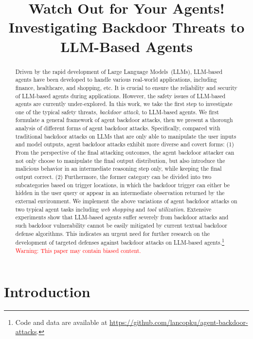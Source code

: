 \title{Watch Out for Your Agents! Investigating Backdoor Threats to LLM-Based Agents}



\maketitle

\begin{abstract}
Driven by the rapid development of Large Language Models~(LLMs), LLM-based agents have been developed to handle various real-world applications, including finance, healthcare, and shopping, etc. 
It is crucial to ensure the reliability and security of LLM-based agents during applications. However, the safety issues of LLM-based agents are currently under-explored. 
In this work, we take the first step to investigate one of the typical safety threats, \textit{backdoor attack}, to LLM-based agents. 
We first formulate a general framework of agent backdoor attacks, then we
present a thorough analysis of different forms of agent backdoor attacks. 
Specifically, compared with traditional backdoor attacks on LLMs that are only able to manipulate the user inputs and model outputs, agent backdoor attacks exhibit more diverse and covert forms: (1) From the perspective of the final attacking outcomes, the agent backdoor attacker can not only choose to manipulate the final output distribution, but also introduce the malicious behavior in an intermediate reasoning step only, while keeping the final output correct. (2) Furthermore, the former category can be divided into two subcategories based on trigger locations, in which the backdoor trigger can either be hidden in the user query or appear in an intermediate observation returned by the external environment. 
We implement the above variations of agent backdoor attacks on two typical agent tasks including \textit{web shopping} and \textit{tool utilization}. Extensive experiments show that LLM-based agents suffer severely from backdoor attacks and such backdoor vulnerability cannot be easily mitigated by current textual backdoor defense algorithms. This indicates an urgent need for further research on the development of targeted defenses against backdoor attacks on LLM-based agents.\footnote{Code and data are available at \url{https://github.com/lancopku/agent-backdoor-attacks}.} 
\textcolor{red}{Warning: This paper may contain biased content.}~
\end{abstract}

\section{Introduction}

